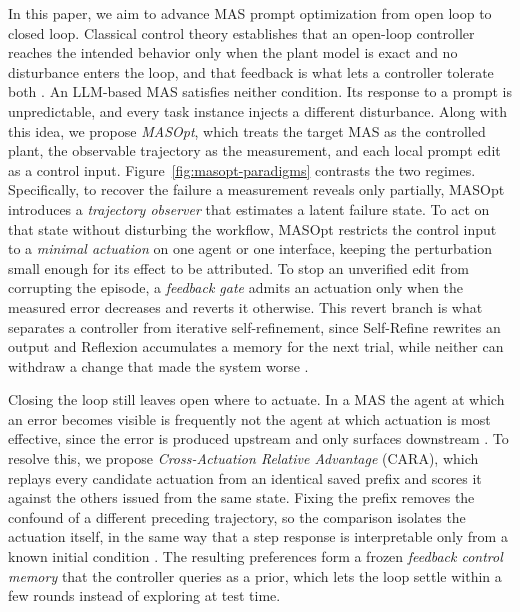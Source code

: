 \documentclass{article}
\theoremstyle{definition}
\begin{document}
In this paper, we aim to advance MAS prompt optimization from open loop to closed loop. Classical control theory establishes that an open-loop controller reaches the intended behavior only when the plant model is exact and no disturbance enters the loop, and that feedback is what lets a controller tolerate both \citep{astrom2008feedback,goodwin2001control}. An LLM-based MAS satisfies neither condition. Its response to a prompt is unpredictable, and every task instance injects a different disturbance. Along with this idea, we propose \emph{MASOpt}, which treats the target MAS as the controlled plant, the observable trajectory as the measurement, and each local prompt edit as a control input. Figure~\ref{fig:masopt-paradigms} contrasts the two regimes. Specifically, to recover the failure a measurement reveals only partially, MASOpt introduces a \emph{trajectory observer} that estimates a latent failure state. To act on that state without disturbing the workflow, MASOpt restricts the control input to a \emph{minimal actuation} on one agent or one interface, keeping the perturbation small enough for its effect to be attributed. To stop an unverified edit from corrupting the episode, a \emph{feedback gate} admits an actuation only when the measured error decreases and reverts it otherwise. This revert branch is what separates a controller from iterative self-refinement, since Self-Refine rewrites an output and Reflexion accumulates a memory for the next trial, while neither can withdraw a change that made the system worse \citep{madaan2023selfrefine,shinn2023reflexion}.

Closing the loop still leaves open where to actuate. In a MAS the agent at which an error becomes visible is frequently not the agent at which actuation is most effective, since the error is produced upstream and only surfaces downstream \citep{mapro2026}. To resolve this, we propose \emph{Cross-Actuation Relative Advantage} (CARA), which replays every candidate actuation from an identical saved prefix and scores it against the others issued from the same state. Fixing the prefix removes the confound of a different preceding trajectory, so the comparison isolates the actuation itself, in the same way that a step response is interpretable only from a known initial condition \citep{astrom2008feedback,goodwin2001control}. The resulting preferences form a frozen \emph{feedback control memory} that the controller queries as a prior, which lets the loop settle within a few rounds instead of exploring at test time.
\end{document}
